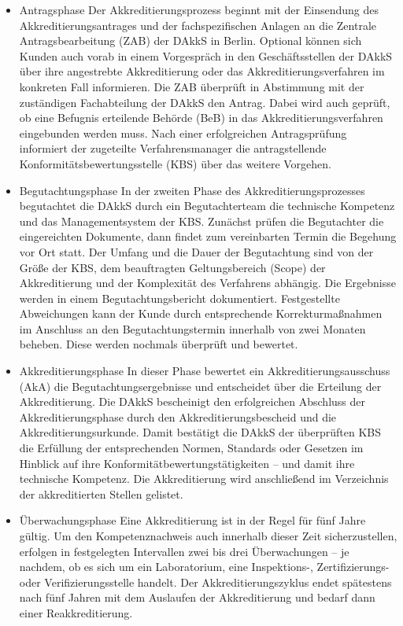 \begin{itemize}
	
\item Antragsphase \newline
Der Akkreditierungsprozess beginnt mit der Einsendung des Akkreditierungsantrages und der fachspezifischen Anlagen an die Zentrale Antragsbearbeitung (ZAB) der DAkkS in Berlin.
Optional können sich Kunden auch vorab in einem Vorgespräch in den Geschäfts\-stel\-len der DAkkS über ihre angestrebte Akkreditierung oder das Akkreditierungsverfahren im konkreten Fall informieren.
Die ZAB überprüft in Abstimmung mit der zuständigen Fachabteilung der DAkkS den Antrag. Dabei wird auch geprüft, ob eine Befugnis erteilende Behörde (BeB) in das Akkreditierungsverfahren eingebunden werden muss.
Nach einer erfolgreichen Antragsprüfung informiert der zugeteilte Verfahrensmanager die antragstellende Konformitätsbewertungsstelle (KBS) über das weitere Vorgehen.

\item Begutachtungsphase \newline
In der zweiten Phase des Akkreditierungsprozesses begutachtet die DAkkS durch ein Begutachterteam die technische Kompetenz und das Managementsystem der KBS. Zunächst prüfen die Begutachter die eingereichten Dokumente, dann findet zum vereinbarten Termin die Begehung vor Ort statt. Der Umfang und die Dauer der Begutachtung sind von der Größe der KBS, dem beauftragten Geltungsbereich (Scope) der Akkreditierung und der Komplexität des Verfahrens abhängig.
Die Ergebnisse werden in einem Begutachtungsbericht dokumentiert.
Festgestellte Abweichungen kann der Kunde durch entsprechende Korrekturmaßnahmen im Anschluss an den Begutachtungstermin innerhalb von zwei Monaten beheben. Diese werden nochmals überprüft und bewertet.

\item Akkreditierungsphase \newline
In dieser Phase bewertet ein Akkreditierungsausschuss (AkA) die Begutachtungsergebnisse und entscheidet über die Erteilung der Akkreditierung.
Die DAkkS bescheinigt den erfolgreichen Abschluss der Akkreditierungsphase durch den Akkreditierungsbescheid und die Akkreditierungsurkunde. Damit bestätigt die DAkkS der überprüften KBS die Erfüllung der entsprechenden Normen, Standards oder Gesetzen im Hinblick auf ihre Konformitätbewertungstätigkeiten – und damit ihre technische Kompetenz.
Die Akkreditierung wird anschließend im Verzeichnis der akkreditierten Stellen gelistet.
\item Überwachungsphase \newline
Eine Akkreditierung ist in der Regel für fünf Jahre gültig. Um den Kompetenznachweis auch innerhalb dieser Zeit sicherzustellen, erfolgen in festgelegten Intervallen zwei bis drei Überwachungen – je nachdem, ob es sich um ein Laboratorium, eine Inspektions-, Zertifizierungs- oder Verifizierungsstelle handelt.
Der Akkreditierungszyklus endet spät\-est\-ens nach fünf Jahren mit dem Auslaufen der Akkreditierung und bedarf dann einer Reakkreditierung.	
\end{itemize}
